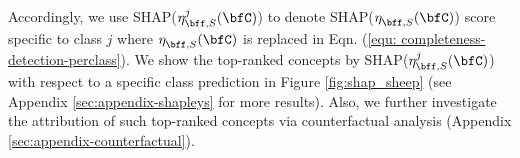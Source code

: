 Accordingly, we use SHAP($\eta^{j}_{\bff, S}(\bfC)$) to denote SHAP($\eta^{}_{\bff, S}(\bfC) $) score specific to class $j$ where $\eta^{}_{\bff, S}(\bfC)$ is replaced in Eqn. (\ref{equ: completeness-detection-perclass}).
We show the top-ranked concepts by SHAP($\eta^{j}_{\bff, S}(\bfC)$) with respect to a specific class prediction in Figure \ref{fig:shap_sheep} (see Appendix \ref{sec:appendix-shapleys} for more results).
Also, we further investigate the attribution of such top-ranked concepts via counterfactual analysis (Appendix \ref{sec:appendix-counterfactual}).




